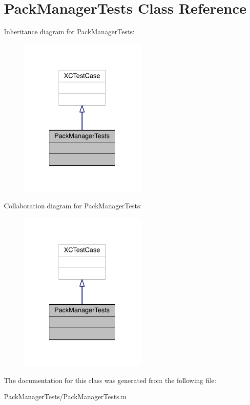 \hypertarget{interface_pack_manager_tests}{\section{Pack\-Manager\-Tests Class Reference}
\label{interface_pack_manager_tests}
}


Inheritance diagram for Pack\-Manager\-Tests\-:\nopagebreak
\begin{figure}[H]
\begin{center}
\leavevmode
\includegraphics[width=180pt]{interface_pack_manager_tests__inherit__graph}
\end{center}
\end{figure}


Collaboration diagram for Pack\-Manager\-Tests\-:\nopagebreak
\begin{figure}[H]
\begin{center}
\leavevmode
\includegraphics[width=180pt]{interface_pack_manager_tests__coll__graph}
\end{center}
\end{figure}


The documentation for this class was generated from the following file\-:\begin{DoxyCompactItemize}
\item 
Pack\-Manager\-Tests/Pack\-Manager\-Tests.\-m\end{DoxyCompactItemize}
